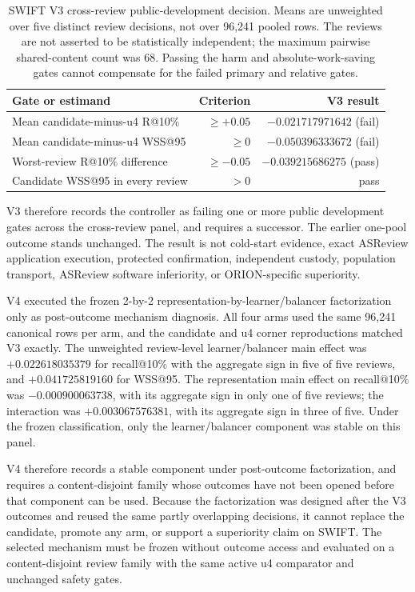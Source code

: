 \begin{table}[H]
\centering
\small
\begin{tabular}{lrr}
\hline
Gate or estimand & Criterion & V3 result \\
\hline
Mean candidate-minus-u4 R@10\% & $\ge +0.05$ & $-0.021717971642$ (fail) \\
Mean candidate-minus-u4 WSS@95 & $\ge 0$ & $-0.050396333672$ (fail) \\
Worst-review R@10\% difference & $\ge -0.05$ & $-0.039215686275$ (pass) \\
Candidate WSS@95 in every review & $>0$ & pass \\
\hline
\end{tabular}
\caption{SWIFT V3 cross-review public-development decision.  Means are
unweighted over five distinct review decisions, not over 96,241 pooled rows.
The reviews are not asserted to be statistically independent; the maximum
pairwise shared-content count was 68.  Passing the harm and absolute-work-saving
gates cannot compensate for the failed primary and relative gates.}
\label{tab:p2-swift-v3}
\end{table}

V3 therefore records the controller as failing one or more public development gates across the cross-review panel, and requires a successor.
The earlier one-pool outcome stands unchanged.
The result is not cold-start evidence, exact ASReview application execution,
protected confirmation, independent custody, population transport, ASReview
software inferiority, or ORION-specific superiority.

V4 executed the frozen 2-by-2 representation-by-learner/balancer factorization
only as post-outcome mechanism diagnosis.  All four arms used the same 96,241
canonical rows per arm, and the candidate and u4 corner reproductions matched
V3 exactly.  The unweighted review-level learner/balancer main effect was
$+0.022618035379$ for recall@10\% with the aggregate sign in five of five
reviews, and $+0.041725819160$ for WSS@95.  The representation main effect on
recall@10\% was $-0.000900063738$, with its aggregate sign in only one of five
reviews; the interaction was $+0.003067576381$, with its aggregate sign in
three of five.  Under the frozen classification, only the learner/balancer
component was stable on this panel.

V4 therefore records a stable component under post-outcome factorization, and requires a content-disjoint family whose outcomes have not been opened before that component can be used.
Because the factorization was designed after the V3 outcomes and reused the
same partly overlapping decisions, it cannot replace the candidate, promote
any arm, or support a superiority claim on SWIFT.  The selected mechanism must
be frozen without outcome access and evaluated on a content-disjoint review
family with the same active u4 comparator and unchanged safety gates.


